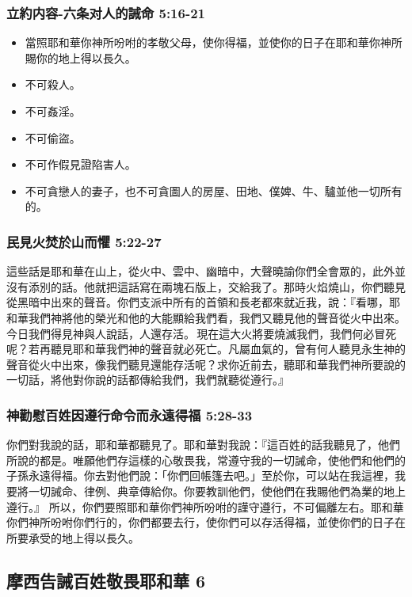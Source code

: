 \subsubsection{立約内容-六条对人的誡命 5:16-21}
\begin{itemize} 
\itemsep-.35em 
\item 當照耶和華你神所吩咐的孝敬父母，使你得福，並使你的日子在耶和華你神所賜你的地上得以長久。
\item 不可殺人。
\item 不可姦淫。
\item 不可偷盜。
\item 不可作假見證陷害人。
\item 不可貪戀人的妻子，也不可貪圖人的房屋、田地、僕婢、牛、驢並他一切所有的。
\end{itemize}

\subsubsection{民見火焚於山而懼 5:22-27}
這些話是耶和華在山上，從火中、雲中、幽暗中，大聲曉諭你們全會眾的，此外並沒有添別的話。他就把這話寫在兩塊石版上，交給我了。那時火焰燒山，你們聽見從黑暗中出來的聲音。你們支派中所有的首領和長老都來就近我，說：『看哪，耶和華我們神將他的榮光和他的大能顯給我們看，我們又聽見他的聲音從火中出來。今日我們得見神與人說話，人還存活。 現在這大火將要燒滅我們，我們何必冒死呢？若再聽見耶和華我們神的聲音就必死亡。凡屬血氣的，曾有何人聽見永生神的聲音從火中出來，像我們聽見還能存活呢？求你近前去，聽耶和華我們神所要說的一切話，將他對你說的話都傳給我們，我們就聽從遵行。』

\subsubsection{神勸慰百姓因遵行命令而永遠得福 5:28-33}
你們對我說的話，耶和華都聽見了。耶和華對我說：『這百姓的話我聽見了，他們所說的都是。唯願他們存這樣的心敬畏我，常遵守我的一切誡命，使他們和他們的子孫永遠得福。你去對他們說：「你們回帳篷去吧。」至於你，可以站在我這裡，我要將一切誡命、律例、典章傳給你。你要教訓他們，使他們在我賜他們為業的地上遵行。』
所以，你們要照耶和華你們神所吩咐的謹守遵行，不可偏離左右。耶和華你們神所吩咐你們行的，你們都要去行，使你們可以存活得福，並使你們的日子在所要承受的地上得以長久。

\subsection{摩西告誡百姓敬畏耶和華 6}

